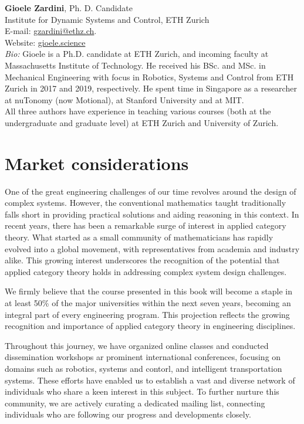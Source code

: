 \documentclass[10pt, article, one side]{memoir}
\begin{document}
    \noindent \textbf{Gioele Zardini}, Ph.
    D.
    Candidate\\
    Institute for Dynamic Systems and Control, ETH Zurich\\
    E-mail: \href{mailto:gzardini@ethz.ch}{gzardini@ethz.ch}.
    \\
    Website: \href{https://gioele.science}{gioele.science}\\
    \emph{Bio:}
    Gioele is a Ph.D.
    candidate at ETH Zurich, and incoming faculty at Massachusetts Institute of Technology.
    He received his BSc.
    and MSc. in Mechanical Engineering with focus in Robotics, Systems and Control from ETH Zurich in 2017 and 2019, respectively.
    He spent time in Singapore as a researcher at nuTonomy (now Motional), at Stanford University and at MIT.
    \\

    All three authors have experience in teaching various courses (both at the undergraduate and graduate level) at ETH Zurich and University of Zurich.

    \section{Market considerations}
    One of the great engineering challenges of our time revolves around the design of complex systems.
    However, the conventional mathematics taught traditionally falls short in providing practical solutions and aiding reasoning in this context.
    In recent years, there has been a remarkable surge of interest in applied category theory.
    What started as a small community of mathematicians has rapidly evolved into a global movement, with representatives from academia and industry alike.
    This growing interest underscores the recognition of the potential that applied category theory holds in addressing complex system design challenges.

    We firmly believe that the course presented in this book will become a staple in at least 50\% of the major universities within the next seven years, becoming an integral part of every engineering program.
    This projection reflects the growing recognition and importance of applied category theory in engineering disciplines.

    Throughout this journey, we have organized online classes and conducted dissemination workshops ar prominent international conferences, focusing on domains such as robotics, systems and contorl, and intelligent transportation systems.
    These efforts have enabled us to establish a vast and diverse network of individuals who share a keen interest in this subject.
    To further nurture this community, we are actively curating a dedicated mailing list, connecting individuals who are following our progress and developments closely.
\end{document}
